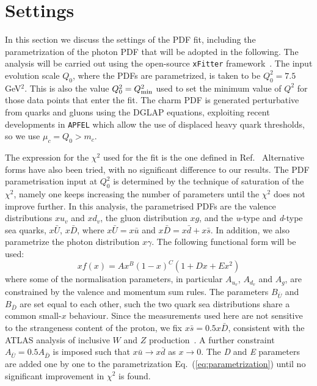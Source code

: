 \section{Settings}
\label{sec:fitsettings}

In this section we discuss the settings of
the PDF fit, including the parametrization of the photon PDF
that will be adopted in the following.
%
The analysis will be carried out using the open-source
{\tt xFitter} framework~\cite{Alekhin:2014irh}.
%
The input evolution scale $Q_0$, where the PDFs
are parametrized, is taken to be $Q^2_0 = 7.5~$GeV$^2$.
%
This is also the value $Q^2_0=Q^2_{\rm min}$ used to set the
minimum value of $Q^2$ for those data points that enter the fit.
%
The charm PDF is generated perturbative from quarks and gluons
using the DGLAP equations, exploiting recent developments
in {\tt APFEL} which allow the use of displaced heavy quark
thresholds, so we use $\mu_c=Q_0 > m_c$.

The  expression for the $\chi^2$ used for the fit is the one
defined in Ref.~\cite{Aaron:2009aa}
%
Alternative forms have also been tried,
with no significant difference to our results.
% 
The PDF parametrisation input at $Q^2_0$ is determined by the technique of saturation of the $\chi^{2}$, namely one keeps increasing
the number of parameters until the $\chi^{2}$ does not improve further.
%
In this analysis,
the parametrised PDFs are the valence distributions $xu_{v}$ and $xd_{v}$, the gluon distribution $xg$, and the \textit{u}-type and \textit{d}-type sea quarks, $x\bar{U}$, $x\bar{D}$, where $x\bar{U} = x\bar{u}$ and $x\bar{D} = x\bar{d} + x\bar{s}$.
%
In addition, we also parametrize the photon distribution $x\gamma$.
%
The following  functional form will be used:
\begin{equation}
  \label{eq:parametrization}
xf(x) = Ax^{B}(1-x)^{C}(1+Dx+Ex^{2})
\end{equation}
where some of the normalisation parameters, in particular
$A_{u_{v}}$, $A_{d_{v}}$ and $A_{g}$, are constrained by the valence and momentum
sum rules.
%
The  parameters $B_{\bar{U}}$ and $B_{\bar{D}}$ are set equal to each other, such
the two quark sea distributions share a common small-$x$ behaviour.
%
Since the measurements used here are not sensitive to the 
strangeness content of the proton, we fix $x\bar{s} = 0.5x\bar{D}$, consistent with
the ATLAS 
analysis of inclusive $W$ and $Z$ production~\cite{Aad:2012sb,Aaboud:2016btc}.
%
A further constraint $A_{\bar{U}} = 0.5 A_{\bar{D}}$ is imposed such that $x\bar{u} \to x\bar{d}$ as $x \to 0$.
The \textit{D} and \textit{E} parameters are added one by one
to the parametrization Eq.~(\ref{eq:parametrization}) until no significant 
improvement in $\chi^{2}$ is found. 

